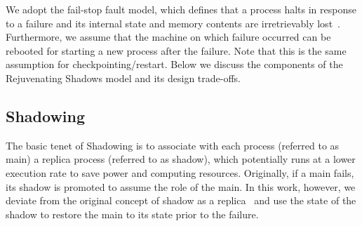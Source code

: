 

We adopt the fail-stop fault model, which defines that a process halts in response to a failure and its internal state and memory contents are irretrievably 
lost~\cite{Schlichting1983}. Furthermore, we assume that the machine on which failure occurred can be rebooted for starting a new process after the failure. Note that this is the same assumption for checkpointing/restart. Below we discuss the components of the Rejuvenating Shadows model and its design trade-offs.
 

\subsection{Shadowing}
\label{sec:shadow}
The basic tenet of Shadowing is to associate with each process (referred to as main) a replica process (referred to as shadow), which potentially runs at a lower execution rate to save power and computing resources. Originally, if a main fails, its shadow is promoted to assume the role of the main. 
In this work, however, we deviate from the original concept of shadow as a replica~\cite{cui_2016_scalcom} and use the state of the shadow to restore the main to its state prior to the failure. 

